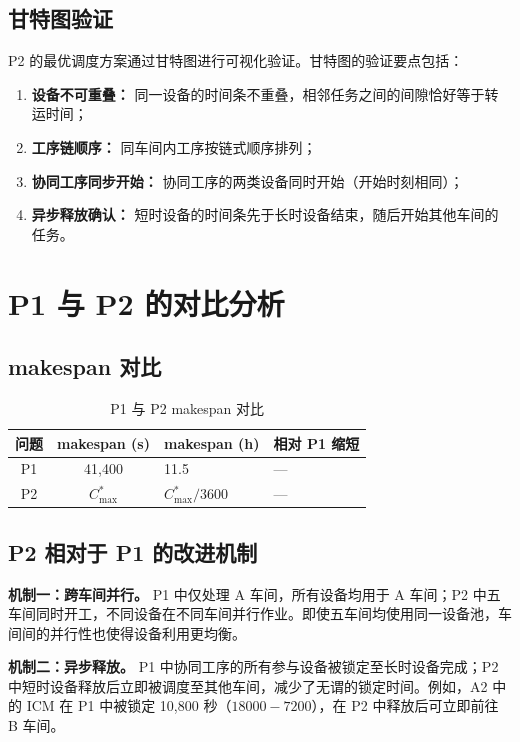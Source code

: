 \documentclass[UTF8,a4paper,12pt]{ctexart}
\begin{document}
\subsection{甘特图验证}
P2 的最优调度方案通过甘特图进行可视化验证。甘特图的验证要点包括：
\begin{enumerate}
  \item \textbf{设备不可重叠：} 同一设备的时间条不重叠，相邻任务之间的间隙恰好等于转运时间；
  \item \textbf{工序链顺序：} 同车间内工序按链式顺序排列；
  \item \textbf{协同工序同步开始：} 协同工序的两类设备同时开始（开始时刻相同）；
  \item \textbf{异步释放确认：} 短时设备的时间条先于长时设备结束，随后开始其他车间的任务。
\end{enumerate}

\section{P1 与 P2 的对比分析}
\subsection{makespan 对比}
\begin{table}[htbp]
  \centering
  \caption{P1 与 P2 makespan 对比}
  \label{tab:p1_p2_compare}
  \begin{tabular}{ccll}
    \toprule
    问题 & makespan (s) & makespan (h) & 相对 P1 缩短 \\
    \midrule
    P1 & 41,400 & 11.5 & — \\
    P2 & $C_{\max}^*$ & $C_{\max}^* / 3600$ & — \\
    \bottomrule
  \end{tabular}
\end{table}

\subsection{P2 相对于 P1 的改进机制}
\textbf{机制一：跨车间并行。} P1 中仅处理 A 车间，所有设备均用于 A 车间；P2 中五车间同时开工，不同设备在不同车间并行作业。即使五车间均使用同一设备池，车间间的并行性也使得设备利用更均衡。

\textbf{机制二：异步释放。} P1 中协同工序的所有参与设备被锁定至长时设备完成；P2 中短时设备释放后立即被调度至其他车间，减少了无谓的锁定时间。例如，A2 中的 ICM 在 P1 中被锁定 10,800 秒（$18000 - 7200$），在 P2 中释放后可立即前往 B 车间。
\end{document}
